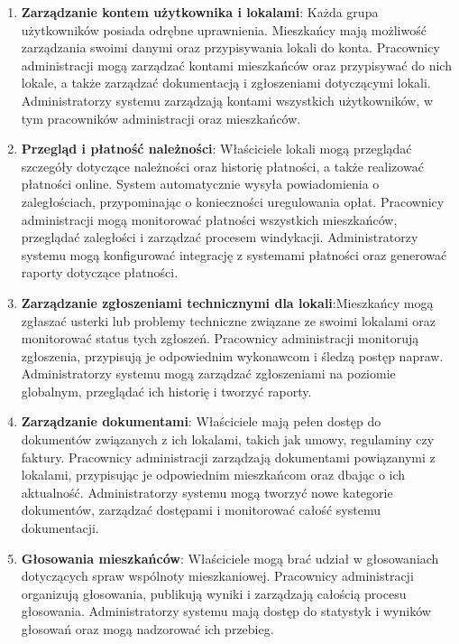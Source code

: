 \begin{enumerate}[label=\arabic*.]

    \item \textbf{Zarządzanie kontem użytkownika i lokalami}: Każda grupa użytkowników posiada odrębne uprawnienia. Mieszkańcy mają możliwość zarządzania swoimi danymi oraz przypisywania lokali do konta. Pracownicy administracji mogą zarządzać kontami mieszkańców oraz przypisywać do nich lokale, a także zarządzać dokumentacją i zgłoszeniami dotyczącymi lokali. Administratorzy systemu zarządzają kontami wszystkich użytkowników, w tym pracowników administracji oraz mieszkańców.

	\item \textbf{Przegląd i płatność należności}: Właściciele lokali mogą przeglądać szczegóły dotyczące należności oraz historię płatności, a także realizować płatności online. System automatycznie wysyła powiadomienia o zaległościach, przypominając o konieczności uregulowania opłat. Pracownicy administracji mogą monitorować płatności wszystkich mieszkańców, przeglądać zaległości i zarządzać procesem windykacji. Administratorzy systemu mogą konfigurować integrację z systemami płatności oraz generować raporty dotyczące płatności.

	\item \textbf{Zarządzanie zgłoszeniami technicznymi dla lokali}:Mieszkańcy mogą zgłaszać usterki lub problemy techniczne związane ze swoimi lokalami oraz monitorować status tych zgłoszeń. Pracownicy administracji monitorują zgłoszenia, przypisują je odpowiednim wykonawcom i śledzą postęp napraw. Administratorzy systemu mogą zarządzać zgłoszeniami na poziomie globalnym, przeglądać ich historię i tworzyć raporty.

	\item \textbf{Zarządzanie dokumentami}: Właściciele mają pełen dostęp do dokumentów związanych z ich lokalami, takich jak umowy, regulaminy czy faktury. Pracownicy administracji zarządzają dokumentami powiązanymi z lokalami, przypisując je odpowiednim mieszkańcom oraz dbając o ich aktualność. Administratorzy systemu mogą tworzyć nowe kategorie dokumentów, zarządzać dostępami i monitorować całość systemu dokumentacji.

	\item \textbf{Głosowania mieszkańców}: Właściciele mogą brać udział w głosowaniach dotyczących spraw wspólnoty mieszkaniowej. Pracownicy administracji organizują głosowania, publikują wyniki i zarządzają całością procesu głosowania. Administratorzy systemu mają dostęp do statystyk i wyników głosowań oraz mogą nadzorować ich przebieg.
	

\end{enumerate}
